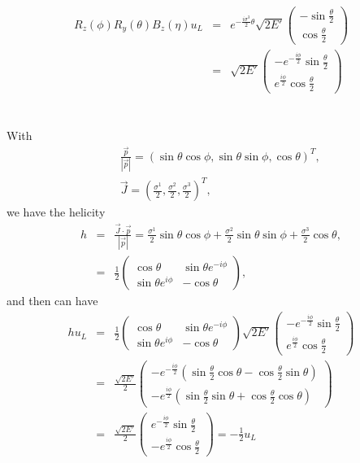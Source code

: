 \documentclass[11pt]{article}
\begin{document}
\begin{eqnarray}
    R_z(\phi)  R_y(\theta)B_z(\eta)u_L &=& e^{-\frac{i \sigma^3}{2} \theta}\sqrt{2E'}
    \begin{pmatrix}
    -\sin \frac{\theta}{2} \\ \cos \frac{\theta}{2}
    \end{pmatrix}\\
    &=& \sqrt{2E'}
    \begin{pmatrix}
        -e^{-\frac{i \phi}{2}}\sin \frac{\theta}{2} \\ e^{\frac{i \phi}{2}}\cos \frac{\theta}{2}
    \end{pmatrix}
\end{eqnarray}

\section{ }
With
\begin{eqnarray}
    &&\frac{\vec p}{|\vec p|}
    = (\sin\theta\cos\phi, \sin\theta\sin\phi, \cos\theta)^T, \\ 
    &&\vec{J} = (\frac{\sigma^1}{2}, \frac{\sigma^2}{2}, \frac{\sigma^3}{2})^T ,
\end{eqnarray}
we have the helicity
\begin{eqnarray}
    h&=&\frac{\vec{J} \cdot {\vec p}}{|\vec{p}|}=\frac{\sigma^1}{2}\sin\theta\cos\phi +\frac{\sigma^2}{2}\sin\theta\sin\phi +\frac{\sigma^3}{2} \cos\theta, \\
    &=& \frac{1}{2}
    \begin{pmatrix}
        \cos\theta & \sin\theta e^{-i\phi} \\ 
        \sin\theta e^{i\phi} & -\cos\theta
    \end{pmatrix},
\end{eqnarray}
and then can have
\begin{eqnarray}
    h u_L&=&\frac{1}{2} 
    \begin{pmatrix}
        \cos\theta & \sin\theta e^{-i\phi} \\ 
        \sin\theta e^{i\phi} & -\cos\theta
    \end{pmatrix}
    \sqrt{2E'}
    \begin{pmatrix}
        -e^{-\frac{i \phi}{2}}\sin \frac{\theta}{2} \\ e^{\frac{i \phi}{2}}\cos \frac{\theta}{2}
    \end{pmatrix} \\
    &=& \frac{\sqrt{2E'}}{2}
    \begin{pmatrix}
        -e^{-\frac{i \phi}{2}}(\sin\frac{\theta}{2}\cos\theta- \cos\frac{\theta}{2}\sin\theta)\\ -e^{\frac{i \phi}{2}}(\sin\frac{\theta}{2}\sin\theta+\cos\frac{\theta}{2}\cos\theta)
    \end{pmatrix}\\ 
    &=& \frac{\sqrt{2E'}}{2}
    \begin{pmatrix}
        e^{-\frac{i \phi}{2}}\sin \frac{\theta}{2} \\ -e^{\frac{i \phi}{2}}\cos \frac{\theta}{2}
    \end{pmatrix}
    =-\frac{1}{2}u_L
\end{eqnarray}
\end{document}
